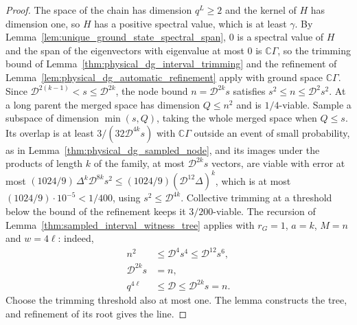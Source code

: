 \begin{proof}\leanok
    The space of the chain has dimension $q^L\ge2$ and the kernel of $H$ has
    dimension one, so $H$ has a positive spectral value, which is at least
    $\gamma$. By Lemma~\ref{lem:unique_ground_state_spectral_span}, $0$ is a
    spectral value of $H$ and the span of the eigenvectors with eigenvalue at
    most $0$ is $\mathbb C\Gamma$, so the trimming bound of
    Lemma~\ref{thm:physical_dg_interval_trimming} and the refinement of
    Lemma~\ref{lem:physical_dg_automatic_refinement} apply with ground space
    $\mathbb C\Gamma$. Since $\mathcal D^{2(k-1)}<s\le\mathcal D^{2k}$, the
    node bound $n=\mathcal D^{2k}s$ satisfies $s^2\le n\le\mathcal D^2s^2$. At a
    long parent the merged space has dimension $Q\le n^2$ and is
    $1/4$-viable. Sample a subspace of dimension $\min(s,Q)$, taking the
    whole merged space when $Q\le s$. Its overlap is at least
    $3/(32\mathcal D^{4k}s)$ with $\mathbb C\Gamma$ outside an event of small
    probability, as in Lemma~\ref{thm:physical_dg_sampled_node}, and its images
    under the products of length $k$ of the family, at most $\mathcal D^{2k}s$
    vectors, are viable with error at most
    $(1024/9)\,\Delta^k\mathcal D^{8k}s^2\le(1024/9)(\mathcal D^{12}\Delta)^k$,
    which is at most $(1024/9)\cdot10^{-5}<1/400$, using $s^2\le\mathcal D^{4k}$.
    Collective trimming at a threshold below
    the bound of the refinement keeps it $3/200$-viable. The recursion of
    Lemma~\ref{thm:sampled_interval_witness_tree} applies with
    $r_G=1$, $a=k$, $M=n$ and $w=4\ell$: indeed,
    \begin{align}
        n^2              & \le\mathcal D^4s^4\le\mathcal D^{12}s^6,\nonumber \\
        \mathcal D^{2k}s & =n,\nonumber                                      \\
        q^{4\ell}        & \le\mathcal D\le\mathcal D^{2k}s=n.
        \label{eq:alvv_ff_tree_count_hypotheses}
    \end{align}
    Choose the trimming threshold also at most one. The lemma constructs
    the tree, and refinement of its root gives the line.
\end{proof}

